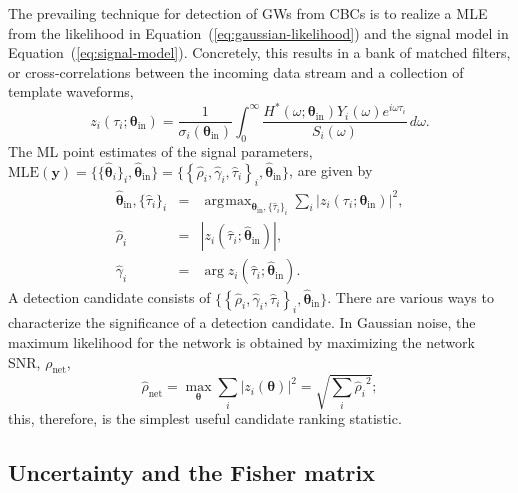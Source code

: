 \documentclass[amsmath,amssymb,aps,prx,reprint,nopreprintnumbers,nofootinbib]{revtex4-1}
\DeclareMathOperator*{\argmax}{\arg\!\max}
\begin{document}
The prevailing technique for detection of \acp{GW} from \acp{CBC} is to realize a \ac{MLE} from the likelihood in Equation~(\ref{eq:gaussian-likelihood}) and the signal model in Equation~(\ref{eq:signal-model}). Concretely, this results in a bank of matched filters, or cross-correlations between the incoming data stream and a collection of template waveforms,
%
\begin{equation}
z_i(\tau_i;\bm\theta_\mathrm{in}) = \frac{1}{\sigma_i (\bm\theta_\mathrm{in})} \int_0^\infty \frac{H^*(\omega; \bm\theta_\mathrm{in}) Y_i(\omega) e^{i \omega \tau_i}}{S_i(\omega)} \,d\omega.
\end{equation}
%
The \ac{ML} point estimates of the signal parameters, $\mathrm{MLE}(\mathbf{y}) = \{\{ \hat{\bm\theta}_i \}_i, \hat{\bm\theta}_\mathrm{in}\} = \{\left\{ \hat\rho_i, \hat\gamma_i, \hat\tau_i \right\}_i, \hat{\bm\theta}_\mathrm{in}\}$, are given by
%
\begin{eqnarray}
    \label{eq:optimal-tau}
    \hat{\bm\theta}_\mathrm{in}, \{\hat\tau_i\}_i
        &=& \argmax_{\bm\theta_\mathrm{in}, \{\hat\tau_i\}_i}
        \sum_i \left| z_i\left(\tau_i;
        \bm\theta_\mathrm{in}\right) \right|^2, \\
    \label{eq:optimal-rho}
    \hat\rho_i &=& \left| z_i\left(\hat\tau_i;
        \hat{\bm\theta}_\mathrm{in}\right) \right|, \\
    \label{eq:optimal-gamma}
    \hat\gamma_i &=& \arg z_i\left(\hat\tau_i;
        \hat{\bm\theta}_\mathrm{in}\right).
\end{eqnarray}
%
A detection candidate consists of $\{\left\{ \hat\rho_i, \hat\gamma_i, \hat\tau_i \right\}_i, \hat{\bm\theta}_\mathrm{in}\}$. There are various ways to characterize the significance of a detection candidate. In Gaussian noise, the maximum likelihood for the network is obtained by maximizing the network \ac{SNR}, $\rho_\mathrm{net}$,
%
\begin{equation}
    \hat\rho_\mathrm{net} = \max_{\bm\theta} \sum_i {|z_i({\bm\theta})|}^2 = \sqrt{\sum_i {\hat\rho_i}^2};
\end{equation}
%
this, therefore, is the simplest useful candidate ranking statistic.

\subsection{Uncertainty and the Fisher matrix}
\label{sec:fisher}
\end{document}
